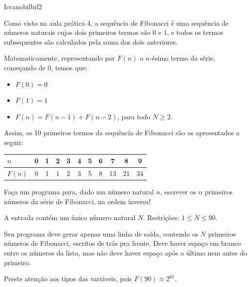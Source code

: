 \documentclass[12pt,a4paper,oneside]{article}
\begin{document}
\begin{problem}{Iccanobif}{bif}{2}
 
Como visto na aula prática 4, a sequência de Fibonacci é uma sequência de números naturais cujos dois primeiros termos são 0 e 1, e todos os termos subsequentes são calculados pela soma dos dois anteriores.

Matematicamente, representando por $F(n)$ o $n$-ésimo termo da série, começando de 0, temos que:

\begin{itemize}
\vspace{-2pt}
    \item $F(0) = 0$
\vspace{-2pt}
    \item $F(1) = 1$
\vspace{-2pt}
    \item $F(n) = F(n-1) + F(n-2)$, para todo $N \geq 2$.
\end{itemize}

Assim, os 10 primeiros termos da sequência de Fibonacci são os apresentados a seguir:

\begin{center}
\begin{tabular}{l|cccccccccc}
    $n$    & 0 & 1 & 2 & 3 & 4 & 5 & 6 & 7 & 8 & 9 \\
    \hline
    $F(n)$ & 0 & 1 & 1 & 2 & 3 & 5 & 8 & 13 & 21 & 34 
\end{tabular}
\end{center}

Faça um programa para, dado um número natural $n$, escrever os $n$ primeiros números da série de Fibonacci, na ordem inversa!

%

\InputFile

A entrada contém um único número natural $N$. Restrições: $1 \leq N \leq 90$.


\OutputFile

Seu programa deve gerar apenas uma linha de saída, contendo os $N$ primeiros números de Fibonacci, escritos de trás pra frente. Deve haver espaço em branco entre os números da lista, mas não deve haver espaço após o último nem antes do primeiro.

\Notes
Preste atenção aos tipos das variáveis, pois $F(90) \approx 2^{61}$.

\Example

\begin{example}
%
\end{example}

\begin{example}
%
\end{example}

\begin{example}
%
\end{example}



\end{problem}
\end{document}
